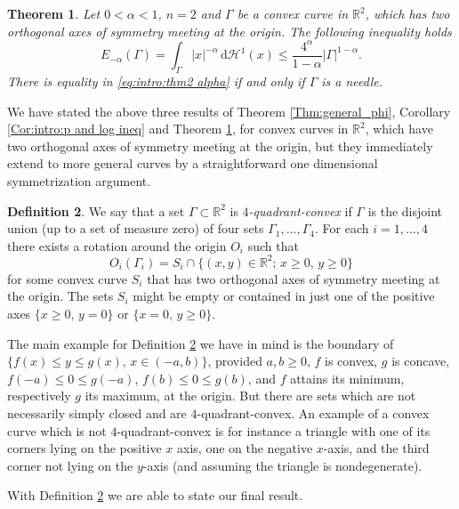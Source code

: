 \documentclass[10pt,leqno]{amsart}
\newcommand{\R}[0]{\mathbb{R}}
\newcommand{\dHo}{\, \mathrm{d} \mathcal{H}^{1}}
\newtheorem{Theorem}{Theorem}
\numberwithin{Theorem}{section}
\theoremstyle{definition}
\newtheorem{Definition}[Theorem]{Definition}
\theoremstyle{remark}
\numberwithin{equation}{section}
\numberwithin{equation}{section}
\begin{document}
\begin{Theorem}
\label{thm:intro:alpha and n is 1}
Let $0<\alpha<1$, $n=2$ and $\Gamma$ be a convex curve in $\R^2$, which has two orthogonal axes of symmetry meeting at the origin.  The following inequality holds
\begin{equation} \label{eq:intro:thm2 alpha}
E_{-\alpha}(\Gamma)=\int_{\Gamma} |x|^{-\alpha}  \dHo(x) \leq 
\frac{4^\alpha}{1-\alpha}|\Gamma|^{1-\alpha}.
\end{equation}
There is equality in  \eqref{eq:intro:thm2 alpha} if and only if $\Gamma$ is a needle.
\end{Theorem}


We have stated the above three results of Theorem \ref{Thm:general_phi}, Corollary \ref{Cor:intro:p and log ineq} and Theorem \ref{thm:intro:alpha and n is 1}, for convex curves in $\R^2$, which have two orthogonal axes of symmetry meeting at the origin, but they immediately extend to more general curves by a straightforward one dimensional symmetrization argument.

\begin{Definition}\label{def:4 quadrant convex}
We say that a set $\Gamma\subset\R^2$ is \textit{$4$-quadrant-convex}  if $\Gamma$ is the disjoint union (up to a set of measure zero) of four sets $\Gamma_1,\ldots,\Gamma_4$. For each $i=1,\ldots,4$ there exists a rotation around the origin $O_i$ such that
$$
  O_i(\Gamma_i)=S_i\cap \{(x,y)\in\R^2;\, x\geq 0,\, y\geq 0\}
$$
for some  convex curve $S_i$ that  has two orthogonal axes of symmetry meeting at the origin. The sets $S_i$ might be empty or contained in just one of the positive axes $\{x\geq 0,\, y=0\}$ or $\{x=0,\, y\geq 0\}.$
\end{Definition}

The main example for Definition \ref{def:4 quadrant convex} we have in mind is the boundary of $\{f(x) \leq y\leq g(x),\, x\in (-a,b)\}$,  provided $a,b\geq 0$, $f$ is convex, $g$ is concave, $f(-a)\leq 0\leq  g(-a)$, $f(b)\leq 0\leq g(b)$, and $f$ attains its minimum, respectively $g$ its maximum, at the origin. But there are sets which are not necessarily simply closed  and are $4$-quadrant-convex. An example of a convex curve which is not $4$-quadrant-convex is for instance a triangle with one of its corners lying on the positive $x$ axis, one on the negative $x$-axis, and the third corner not lying on the $y$-axis (and assuming the triangle is nondegenerate). 

With Definition \ref{def:4 quadrant convex} we are able to state our final result.
\end{document}
